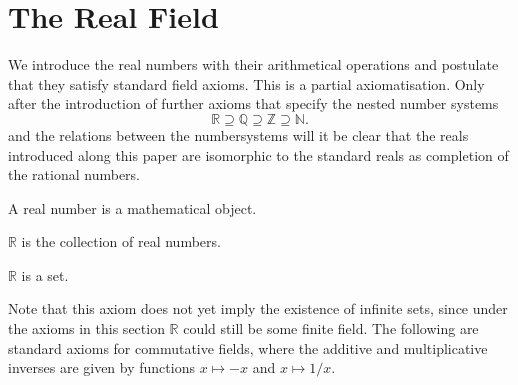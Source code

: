 \documentclass{article}
\begin{document}
\section{The Real Field}

We introduce the real numbers with their  
arithmetical operations and postulate that
they satisfy standard field axioms. This is a partial
axiomatisation.
Only after the introduction
of further axioms that specify the nested number systems
\[ \mathbb{R} \supseteq \mathbb{Q} \supseteq \mathbb{Z}
\supseteq \mathbb{N}. \]
and the relations between the numbersystems will it be clear 
that the reals introduced along this paper are isomorphic to
the standard reals as completion of the rational numbers.

\begin{forthel}

\begin{signature}
A real number is a mathematical object.
\end{signature}

\begin{definition}
$\mathbb{R}$ is the collection of real numbers.
\end{definition}

\begin{axiom}
$\mathbb{R}$ is a set.
\end{axiom}
\end{forthel}
%
Note that this axiom does not yet imply the existence of infinite sets,
since under the axioms in this section $\mathbb{R}$ could still be some finite 
field. The following are standard axioms for commutative fields, where the
additive and multiplicative inverses are given by functions 
$x \mapsto -x$ and $x \mapsto 1/x$. 
%
\end{document}

